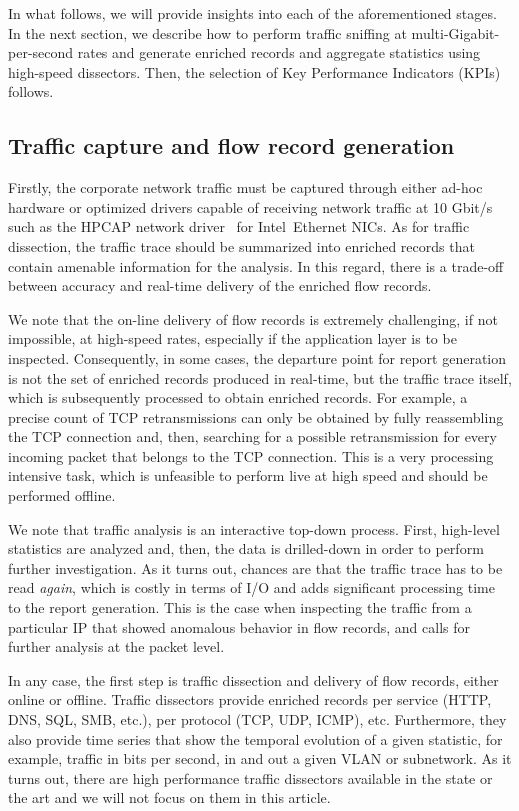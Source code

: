 \documentclass[AMA,STIX1COL]{WileyNJD-v2}
\begin{document}
In what follows, we will provide insights into each of the aforementioned stages. In the next section, we describe how to perform traffic sniffing at multi-Gigabit-per-second rates and generate enriched records and aggregate statistics using high-speed dissectors. Then, the selection of Key Performance Indicators (KPIs) follows.

\subsection{Traffic capture and flow record generation}
Firstly, the corporate network traffic must be captured through either ad-hoc hardware or optimized drivers capable of receiving network traffic at 10 Gbit/s such as the HPCAP network driver~\cite{M3OMON} for Intel\textregistered~Ethernet NICs. As for traffic dissection, the traffic trace should be summarized into enriched records that contain amenable information for the analysis. In this regard, there is a trade-off between accuracy and real-time delivery of the enriched flow records.

We note that the on-line delivery of flow records is extremely challenging, if not impossible, at high-speed rates, especially if the application layer is to be inspected. Consequently, in some cases, the departure point for report generation is not the set of enriched records produced in real-time, but the traffic trace itself, which is subsequently processed to obtain enriched records. For example, a precise count of TCP retransmissions can only be obtained by fully reassembling the TCP connection and, then, searching for a possible retransmission for every incoming packet that belongs to the TCP connection. This is a very processing intensive task, which is unfeasible to perform live at high speed and should be performed offline.

We note that traffic analysis is an interactive top-down process. First, high-level statistics are analyzed and, then, the data is drilled-down in order to perform further investigation. As it turns out, chances are that the traffic trace has to be read {\em again}, which is costly in terms of I/O and adds significant processing time to the report generation. This is the case when inspecting the traffic from a particular IP that showed anomalous behavior in flow records, and calls for further analysis at the packet level.

In any case, the first step is traffic dissection and delivery of flow records, either online or offline. Traffic dissectors provide enriched records per service (HTTP, DNS, SQL, SMB, etc.), per protocol (TCP, UDP, ICMP), etc. Furthermore, they also provide time series that show the temporal evolution of a given statistic, for example, traffic in bits per second, in and out a given VLAN or subnetwork. As it turns out, there are high performance traffic dissectors available in the state or the art \cite{NDPI,HTTPD} and we will not focus on them in this article.
\end{document}
